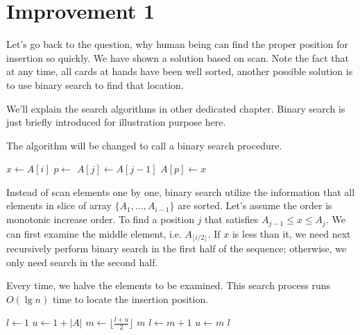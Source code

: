 \documentclass{article}
\begin{document}

\section{Improvement 1}

Let's go back to the question, why human being can find the proper
position for insertion so quickly. We have shown a solution based on scan.
Note the fact that at any time, all cards at hands have been well sorted,
another possible solution is to use binary search to find that location.

We'll explain the search algorithms in other dedicated chapter. Binary
search is just briefly introduced for illustration purpose here.

The algorithm will be changed to call a binary search procedure.

\begin{algorithmic}
    \State $x \gets A[i]$
    \State $p \gets $ 
      \State $A[j] \gets A[j-1]$
    \EndFor
    \State $A[p] \gets x$
  \EndFor
\EndFunction
\end{algorithmic}

Instead of scan elements one by one, binary search utilize the information
that all elements in slice of array $\{A_1, ..., A_{i-1} \}$ are sorted.
Let's assume
the order is monotonic increase order. To find a position $j$ that satisfies
$A_{j-1} \leq x \leq A_{j}$. We can first examine the middle element, i.e. $A_{\lfloor i/2 \rfloor}$. If $x$ is less than it, we need next recursively
perform binary search in the first half of the sequence; otherwise, we
only need search in the second half.

Every time, we halve the elements to be examined. This search process runs
$O(\lg n)$ time to locate the insertion position.

\begin{algorithmic}
  \State $l \gets 1$
  \State $u \gets 1+|A|$
    \State $m \gets \lfloor \frac{l+u}{2} \rfloor$
      \State \Return $m$ 
      \State $l \gets m+1$
    \Else
      \State $u \gets m$
    \EndIf
  \EndWhile
  \State \Return $l$
\EndFunction
\end{algorithmic}
\end{document}
